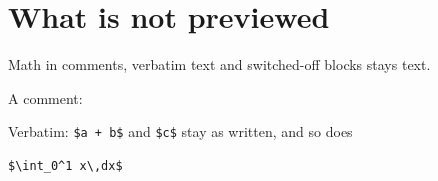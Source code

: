 \documentclass{article}
\begin{document}
\section{What is not previewed}

Math in comments, verbatim text and switched-off blocks stays text.

A comment: %

Verbatim: \verb|$a + b$| and \verb+$c$+ stay as written, and so does

\begin{verbatim}
$\int_0^1 x\,dx$
\end{verbatim}

\end{document}
